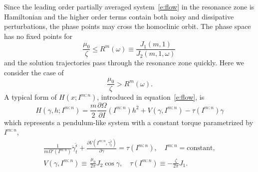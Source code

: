 Since the leading order partially averaged system~\eqref{e:flow} in the resonance zone is Hamiltonian and the higher order terms contain both noisy and dissipative perturbations, the phase points may cross the homoclinic orbit. The phase space has no fixed points for
\[
\frac{\mu_0}{\zeta} \le R^m(\omega)\equiv\frac{J_1(m,1)}{J_2(m,1,\omega)}\,
\]
and the solution trajectories pass through the resonance zone quickly. Here we consider the case of
\[
\frac{\mu_0}{\zeta} > R^m(\omega).
\]
A typical form of $H(x;I^{m:n})$, introduced in equation~\eqref{e:flow}, is
\begin{equation}
\label{E:hamiltonian-ave}
H(\gamma,h;I^{m:n}) = \frac{m}{2}  \frac{\partial \Omega}{\partial I} (I^{m:n}) h^2 + V(\gamma,I^{m:n}) - \tau (I^{m:n}) \gamma
\end{equation}
which represents a pendulum-like system with a constant torque parametrized by $I^{m:n}$,
\begin{equation}
\label{E:pendulum}
\begin{gathered}
\frac{1}{m \Omega'(I^{m:n})} \ddot\gamma_t^{\tilde\epsilon} + \frac{\partial V(I^{m:n},{\gamma}_t^{\tilde\epsilon})}{\partial {\gamma}} = \tau (I^{m:n}), \quad I^{m:n} = \text{constant},\\
V({\gamma},I^{m:n}) \equiv \, \frac{\mu_0}{2\pi} J_2 \cos \gamma, \quad
\tau(I^{m:n}) \equiv - \frac{\zeta}{2\pi} J_1.
\end{gathered}
\end{equation}

